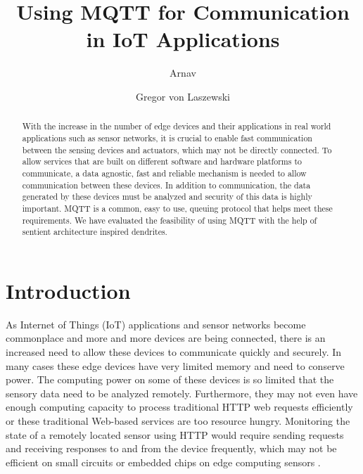 \documentclass[sigconf]{acmart}
\begin{document}
\title{Using MQTT for Communication in IoT Applications}


\author{Arnav}

\author{Gregor von Laszewski}




\begin{abstract}

  With the increase in the number of edge devices and their
  applications in real world applications such as sensor networks, it
  is crucial to
  enable fast communication between the sensing devices and actuators, which
  may not be directly connected. To allow services that are built on 
  different software and hardware platforms to communicate, a
  data agnostic, fast and reliable mechanism is needed to allow
  communication between these devices. In addition to communication,
  the data generated by these devices must be analyzed and security of
  this data is highly important. MQTT is a common, easy to use, queuing
  protocol that helps meet these requirements.
  We have evaluated the feasibility of using MQTT with the help of
  sentient architecture inspired dendrites.

\end{abstract}



\maketitle



\section{Introduction}

As Internet of Things (IoT) applications and sensor networks become
commonplace and more and more devices are being connected, there is an
increased need to allow these devices to communicate quickly and
securely. In many cases these edge devices have very limited memory
and need to conserve power. The computing power on some of these
devices is so limited that the sensory data need to be analyzed
remotely. Furthermore, they may not even have enough computing
capacity to process traditional HTTP web requests efficiently
\cite{mqtt-vs-http,hivemq-website} or these traditional Web-based
services are too resource hungry. Monitoring the state of a remotely
located sensor using HTTP would require sending requests and receiving
responses to and from the device frequently, which may not be
efficient on small circuits or embedded chips on edge computing
sensors \cite{mqtt-vs-http}.
\end{document}
